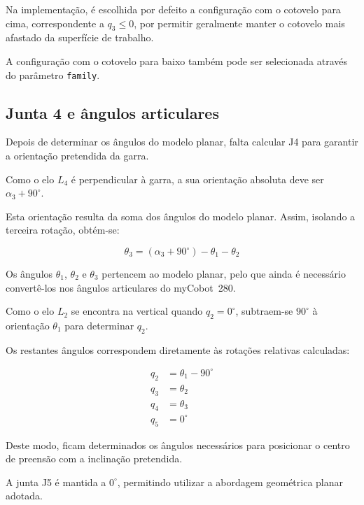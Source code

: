 Na implementação, é escolhida por defeito a configuração com o cotovelo para cima, correspondente a $q_3\leq0$, por permitir geralmente manter o cotovelo mais afastado da superfície de trabalho.

A configuração com o cotovelo para baixo também pode ser selecionada através do parâmetro \texttt{family}.

\subsection{Junta 4 e ângulos articulares}

Depois de determinar os ângulos do modelo planar, falta calcular J4 para garantir a orientação pretendida da garra.

Como o elo $L_4$ é perpendicular à garra, a sua orientação absoluta deve ser $\alpha_3+90^\circ$.

Esta orientação resulta da soma dos ângulos do modelo planar. Assim, isolando a terceira rotação, obtém-se:

\begin{equation}
    \theta_3=
    (\alpha_3+90^\circ)-\theta_1-\theta_2
    \label{eq:ik_theta3}
\end{equation}

Os ângulos $\theta_1$, $\theta_2$ e $\theta_3$ pertencem ao modelo planar, pelo que ainda é necessário convertê-los nos ângulos articulares do myCobot~280.

Como o elo $L_2$ se encontra na vertical quando $q_2=0^\circ$, subtraem-se $90^\circ$ à orientação $\theta_1$ para determinar $q_2$.

Os restantes ângulos correspondem diretamente às rotações relativas calculadas:

\begin{equation}
    \boxed{
    \begin{aligned}
        q_2 &= \theta_1-90^\circ\\
        q_3 &= \theta_2\\
        q_4 &= \theta_3\\
        q_5 &= 0^\circ
    \end{aligned}
    }
    \label{eq:ik_q234}
\end{equation}

Deste modo, ficam determinados os ângulos necessários para posicionar o centro de preensão com a inclinação pretendida.

A junta J5 é mantida a $0^\circ$, permitindo utilizar a abordagem geométrica planar adotada.

